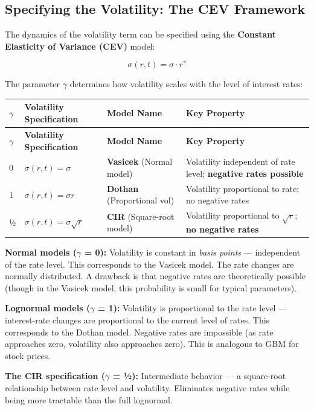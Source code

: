 \documentclass[12pt,openany]{book}
\theoremstyle{definition}
\theoremstyle{remark}
\begin{document}
\medskip
\subsection{Specifying the Volatility: The CEV Framework}
The dynamics of the volatility term can be specified using the \textbf{Constant Elasticity of Variance (CEV)} model:

\[
\sigma(r,t) = \sigma \cdot r^{\gamma}
\]

The parameter $\gamma$ determines how volatility scales with the level of interest rates:

\begingroup
\footnotesize
\begin{longtable}{@{}L{0.15\textwidth}L{0.25\textwidth}L{0.25\textwidth}L{0.25\textwidth}@{}}
\toprule
\textbf{\(\gamma\)} & \textbf{Volatility Specification} & \textbf{Model Name} & \textbf{Key Property} \\
\midrule
\endfirsthead
\toprule
\textbf{\(\gamma\)} & \textbf{Volatility Specification} & \textbf{Model Name} & \textbf{Key Property} \\
\midrule
{} & $\sigma(r,t) = \sigma$ & \textbf{Vasicek} (Normal model) & Volatility independent of rate level; \textbf{negative rates possible} \\
1 & $\sigma(r,t) = \sigma r$ & \textbf{Dothan} (Proportional vol) & Volatility proportional to rate; no negative rates \\
½ & $\sigma(r,t) = \sigma\sqrt{r}$ & \textbf{CIR} (Square-root model) & Volatility proportional to \(\sqrt{r}\); \textbf{no negative rates} \\
\bottomrule
\end{longtable}
\endgroup
\textbf{Normal models (\(\gamma\) = 0):} Volatility is constant in \emph{basis points} --- independent of the rate level. This corresponds to the Vasicek model. The rate changes are normally distributed. A drawback is that negative rates are theoretically possible (though in the Vasicek model, this probability is small for typical parameters).

\textbf{Lognormal models (\(\gamma\) = 1):} Volatility is proportional to the rate level --- interest-rate changes are proportional to the current level of rates. This corresponds to the Dothan model. Negative rates are impossible (as rate approaches zero, volatility also approaches zero). This is analogous to GBM for stock prices.

\textbf{The CIR specification (\(\gamma\) = ½):} Intermediate behavior --- a square-root relationship between rate level and volatility. Eliminates negative rates while being more tractable than the full lognormal.
\end{document}
